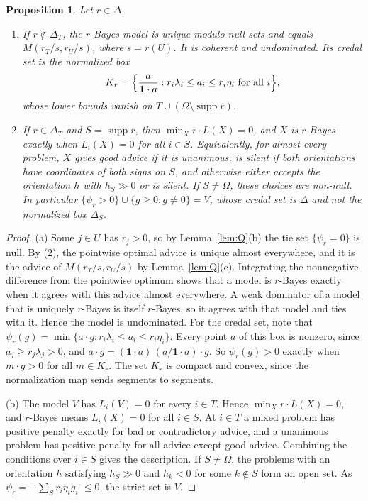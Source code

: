 \documentclass[11pt]{article}
\newtheorem{proposition}[theorem]{Proposition}
\theoremstyle{remark}\newtheorem{remark}[theorem]{Remark}
\newcommand{\supp}{\operatorname{supp}}
\newcommand{\one}{\mathbf 1}
\begin{document}
\begin{proposition}\label{prop:bayes}
Let $r\in\Delta$.
\begin{enumerate}[label=(\alph*),leftmargin=*]
\item If $r\notin\Delta_T$, the $r$-Bayes model is unique modulo null sets
and equals $M(r_T/s,r_U/s)$, where $s=r(U)$. It is coherent and
undominated. Its credal set is the normalized box
\[
 K_r=\Bigl\{\frac{a}{\one\cdot a}:
 r_i\lambda_i\le a_i\le r_i\eta_i\text{ for all }i\Bigr\},
\]
whose lower bounds vanish on $T\cup(\Omega\setminus\supp r)$.
\item If $r\in\Delta_T$ and $S=\supp r$, then $\min_X r\cdot L(X)=0$, and
$X$ is $r$-Bayes exactly when $L_i(X)=0$ for all $i\in S$. Equivalently,
for almost every problem, $X$ gives good advice if it is unanimous, is
silent if both orientations have coordinates of both signs on $S$, and
otherwise either accepts the orientation $h$ with $h_S\gg0$ or is silent.
If $S\ne\Omega$, these choices are non-null. In particular
$\{\psi_r>0\}\cup\{g\ge0:g\ne0\}=V$, whose credal set is $\Delta$ and not
the normalized box $\Delta_S$.
\end{enumerate}
\end{proposition}
\begin{proof}
(a) Some $j\in U$ has $r_j>0$, so by Lemma~\ref{lem:Q}(b) the tie set
$\{\psi_r=0\}$ is null. By (2), the pointwise optimal advice is unique
almost everywhere, and it is the advice of $M(r_T/s,r_U/s)$ by
Lemma~\ref{lem:Q}(c). Integrating the nonnegative difference from the
pointwise optimum shows that a model is $r$-Bayes exactly when it agrees
with this advice almost everywhere. A weak dominator of a model that is
uniquely $r$-Bayes is itself $r$-Bayes, so it agrees with that model and
ties with it. Hence the model is undominated. For the credal set, note that
$\psi_r(g)=\min\{a\cdot g:r_i\lambda_i\le a_i\le r_i\eta_i\}$. Every point
$a$ of this box is nonzero, since $a_j\ge r_j\lambda_j>0$, and
$a\cdot g=(\one\cdot a)\,(a/\one\cdot a)\cdot g$. So $\psi_r(g)>0$ exactly
when $m\cdot g>0$ for all $m\in K_r$. The set $K_r$ is compact and convex,
since the normalization map sends segments to segments.

(b) The model $V$ has $L_i(V)=0$ for every $i\in T$. Hence
$\min_Xr\cdot L(X)=0$, and $r$-Bayes means $L_i(X)=0$ for all $i\in S$. At
$i\in T$ a mixed problem has positive penalty exactly for bad or
contradictory advice, and a unanimous problem has positive penalty for all
advice except good advice. Combining the conditions over $i\in S$ gives
the description. If $S\ne\Omega$, the problems with an orientation $h$
satisfying $h_S\gg0$ and $h_k<0$ for some $k\notin S$ form an open set. As
$\psi_r=-\sum_S r_i\eta_ig_i^-\le0$, the strict set is $V$.
\end{proof}
\end{document}
